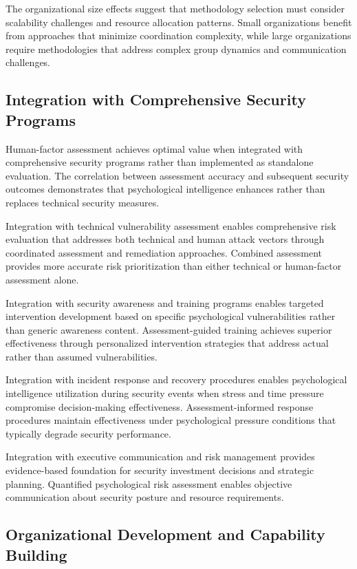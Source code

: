 \documentclass[10pt, twocolumn]{article}
\begin{document}
The organizational size effects suggest that methodology selection must consider scalability challenges and resource allocation patterns. Small organizations benefit from approaches that minimize coordination complexity, while large organizations require methodologies that address complex group dynamics and communication challenges.

\subsection{Integration with Comprehensive Security Programs}

Human-factor assessment achieves optimal value when integrated with comprehensive security programs rather than implemented as standalone evaluation. The correlation between assessment accuracy and subsequent security outcomes demonstrates that psychological intelligence enhances rather than replaces technical security measures.

Integration with technical vulnerability assessment enables comprehensive risk evaluation that addresses both technical and human attack vectors through coordinated assessment and remediation approaches. Combined assessment provides more accurate risk prioritization than either technical or human-factor assessment alone.

Integration with security awareness and training programs enables targeted intervention development based on specific psychological vulnerabilities rather than generic awareness content. Assessment-guided training achieves superior effectiveness through personalized intervention strategies that address actual rather than assumed vulnerabilities.

Integration with incident response and recovery procedures enables psychological intelligence utilization during security events when stress and time pressure compromise decision-making effectiveness. Assessment-informed response procedures maintain effectiveness under psychological pressure conditions that typically degrade security performance.

Integration with executive communication and risk management provides evidence-based foundation for security investment decisions and strategic planning. Quantified psychological risk assessment enables objective communication about security posture and resource requirements.

\subsection{Organizational Development and Capability Building}
\end{document}

